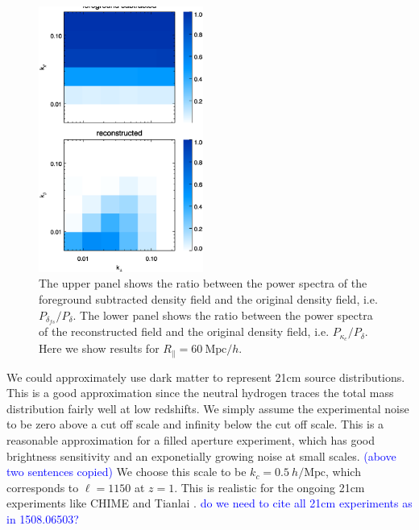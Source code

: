 \documentclass[aps,prl,twocolumn,showpacs,superscriptaddress,groupedaddress,nofootinbib]{revtex4}  %
\newcommand{\mr}{\mathrm}
\newcommand{\tcb}{\textcolor{blue}}
\begin{document}
\begin{figure}[tbp]
\begin{center}
\includegraphics[width=0.48\textwidth]{1.000ratio2d_fswf.eps}
\end{center}
\vspace{-0.7cm}
\caption{The upper panel shows the ratio between the power spectra of the 
foreground subtracted density field and the original density field, i.e. 
$P_{\delta_{fs}}/P_\delta$. 
The lower panel shows the ratio between the power spectra of the reconstructed 
field and the original density field, i.e. $P_{\kappa_c}/P_\delta$.
Here we show results for $R_\parallel=60\ \mr{Mpc}/h$.}
\label{fig:ratio}
\end{figure}

We could approximately use dark matter to represent 21cm source distributions.
This is a good approximation since the neutral hydrogen traces the total mass
distribution fairly well at low redshifts. We simply assume the experimental
noise to be zero above a cut off scale and infinity below the cut off scale.
This is a reasonable approximation for a filled aperture experiment, which
has good brightness sensitivity and an exponetially growing noise at small 
scales. \tcb{(above two sentences copied)}
We choose this scale to be $k_c=0.5\ h/\mr{Mpc}$, which corresponds
to $\ell=1150$ at $z=1$. This is realistic for the ongoing 21cm experiments like
CHIME \cite{2014SPIE.9145E..22B}\cite{2014SPIE.9145E..4VN}
and Tianlai \cite{2012IJMPS..12..256C}\cite{2015ApJ...798...40X}.
\tcb{do we need to cite all 21cm experiments as in 1508.06503?}
\end{document}
